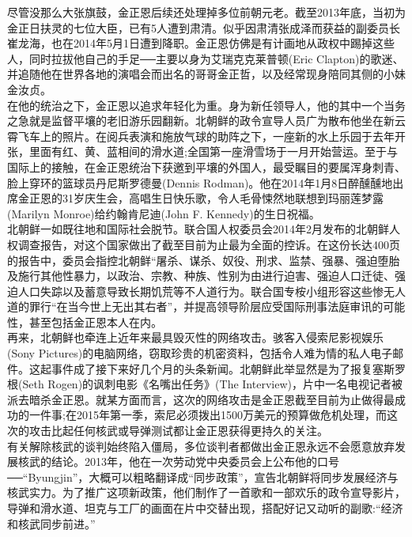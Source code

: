 尽管没那么大张旗鼓，金正恩后续还处理掉多位前朝元老。截至2013年底，当初为金正日扶灵的七位大臣，已有5人遭到肃清。似乎因肃清张成泽而获益的副委员长崔龙海，也在2014年5月1日遭到降职。金正恩仿佛是有计画地从政权中踢掉这些人，同时拉拔他自己的手足──主要以身为艾瑞克克莱普顿(Eric Clapton)的歌迷、并追随他在世界各地的演唱会而出名的哥哥金正哲，以及经常现身陪同其侧的小妹金汝贞。\\

在他的统治之下，金正恩以追求年轻化为重。身为新任领导人，他的其中一个当务之急就是监督平壤的老旧游乐园翻新。北朝鲜的政令宣导人员广为散布他坐在新云霄飞车上的照片。在阅兵表演和施放气球的助阵之下，一座新的水上乐园于去年开张，里面有红、黄、蓝相间的滑水道;全国第一座滑雪场于一月开始营运。至于与国际上的接触，在金正恩统治下获邀到平壤的外国人，最受瞩目的要属浑身刺青、脸上穿环的篮球员丹尼斯罗德曼(Dennis Rodman)。他在2014年1月8日醉醺醺地出席金正恩的31岁庆生会，高唱生日快乐歌，令人毛骨悚然地联想到玛丽莲梦露(Marilyn Monroe)给约翰肯尼迪(John F. Kennedy)的生日祝福。\\

北朝鲜一如既往地和国际社会脱节。联合国人权委员会2014年2月发布的北朝鲜人权调查报告，对这个国家做出了截至目前为止最为全面的控诉。在这份长达400页的报告中，委员会指控北朝鲜“屠杀、谋杀、奴役、刑求、监禁、强暴、强迫堕胎及施行其他性暴力，以政治、宗教、种族、性别为由进行迫害、强迫人口迁徒、强迫人口失踪以及蓄意导致长期饥荒等不人道行为。联合国专桉小组形容这些惨无人道的罪行“在当今世上无出其右者”，并提高领导阶层应受国际刑事法庭审讯的可能性，甚至包括金正恩本人在内。\\

再来，北朝鲜也牵连上近年来最具毁灭性的网络攻击。骇客入侵索尼影视娱乐(Sony Pictures)的电脑网络，窃取珍贵的机密资料，包括令人难为情的私人电子邮件。这起事件成了接下来好几个月的头条新闻。北朝鲜此举显然是为了报复塞斯罗根(Seth Rogen)的讽刺电影《名嘴出任务》(The Interview)，片中一名电视记者被派去暗杀金正恩。就某方面而言，这次的网络攻击是金正恩截至目前为止做得最成功的一件事;在2015年第一季，索尼必须拨出1500万美元的预算做危机处理，而这次的攻击比起任何核武或导弹测试都让金正恩获得更持久的关注。\\

有关解除核武的谈判始终陷入僵局，多位谈判者都做出金正恩永远不会愿意放弃发展核武的结论。2013年，他在一次劳动党中央委员会上公布他的口号──“Byungjin”，大概可以粗略翻译成“同步政策”，宣告北朝鲜将同步发展经济与核武实力。为了推广这项新政策，他们制作了一首歌和一部欢乐的政令宣导影片，导弹和滑水道、坦克与工厂的画面在片中交替出现，搭配好记又动听的副歌:“经济和核武同步前进。”\\

